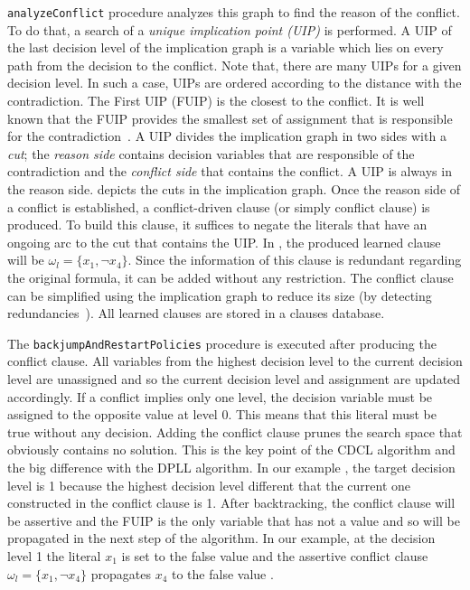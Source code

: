 \texttt{analyzeConflict} procedure analyzes this graph to find the reason of the conflict. To do that, a search of a
\emph{unique implication point (UIP)} is performed. A UIP of the last decision level of the implication graph is a variable
which lies on every path from the decision to the conflict. Note that, there are many UIPs for a given decision level.
In such a case, UIPs are ordered according to the distance with the contradiction. The First UIP (FUIP) is the closest to
the conflict. It is well known that the FUIP provides the smallest set of assignment that is responsible for the
contradiction~\cite{zhang2001efficient}.
A UIP divides the implication graph in two sides with a \emph{cut}; the \emph{reason side} contains decision variables 
that are responsible of the contradiction and the \emph{conflict side} that contains the conflict. 
 A UIP is always in the reason side.  depicts the cuts in the implication graph.
Once the reason side of a conflict is established, a conflict-driven clause (or simply conflict clause) is produced.
To build this clause, it suffices to negate the
literals that have an ongoing arc to the  cut that contains the UIP. In , the produced
learned clause will be $\omega_l = \{x_1, \neg x_4 \}$. Since the information of this clause is redundant regarding 
the original formula, it can be added without any  restriction. The conflict clause can be simplified
using the implication graph to reduce its size (by detecting redundancies~\cite{sorensson2009minimizing}).
 All learned clauses are stored in a clauses database.
 
The \texttt{backjumpAndRestartPolicies} procedure is executed after producing the conflict clause.
All variables from the highest decision level to the current decision level are unassigned and so 
the current decision level and assignment are updated accordingly.
If a conflict implies only one level, the decision variable must be assigned 
to the opposite value at level 0. This means that this literal must be true without any decision.
Adding the conflict clause prunes the search space that obviously contains no solution.
This is the key point of the CDCL algorithm and the big difference with the DPLL algorithm.
 In our example , the target decision level is 1 because the 
 highest decision level different that the current one constructed in the conflict clause is 1.
After backtracking, the conflict clause will be assertive and the FUIP is the only variable that has
not a value and so will be propagated in the next step of the algorithm. In our example, at the decision level 1 the
literal $x_1$ is set to the false value and the assertive conflict clause $\omega_l = \{x_1, \neg x_4 \}$ propagates $x_4$ to 
the false value .

